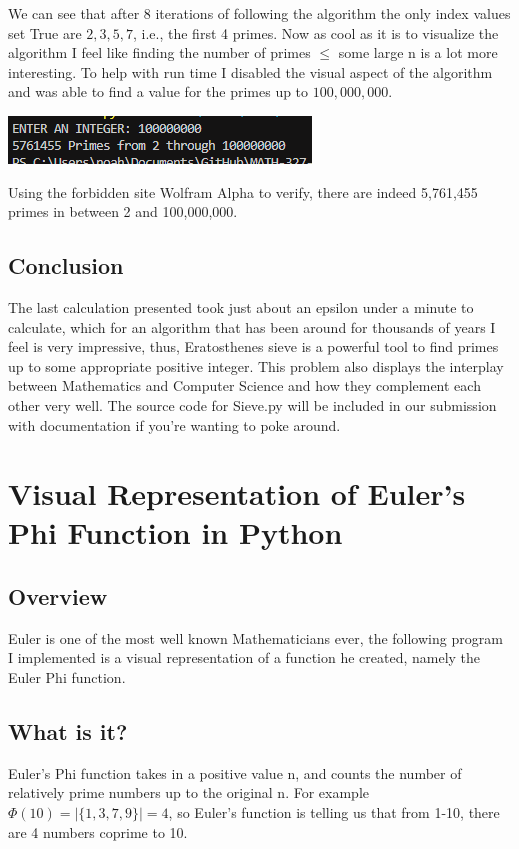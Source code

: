 \documentclass{article}
\begin{document}
We can see that after 8 iterations of following the algorithm the only index values set True are $2,3,5,7$, i.e., the first 4 primes. 
Now as cool as it is to visualize the algorithm I feel like finding the number of primes $\leq$ some large n is a lot more interesting.
To help with run time I disabled the visual aspect of the algorithm and was able to find a value for the primes up to $100,000,000$.
\begin{center}
  \includegraphics[scale=1.0]{primesFound.png}
\end{center}
Using the forbidden site Wolfram Alpha to verify, there are indeed 5,761,455 primes in between 2 and 100,000,000.
\subsection{Conclusion}
The last calculation presented took just about an epsilon under a minute to calculate, which for an algorithm that has been around for thousands of years
I feel is very impressive, thus, Eratosthenes sieve is a powerful tool to find primes up to some appropriate positive integer. This problem also displays the interplay between Mathematics 
and Computer Science and how they complement each other very well. The source code for Sieve.py will be included in our submission with documentation if you're
wanting to poke around.

\newpage
\section{Visual Representation of Euler's Phi Function in Python}
\subsection{Overview}
Euler is one of the most well known Mathematicians ever, the following program I implemented 
is a visual representation of a function he created, namely the Euler Phi function.
\subsection{What is it?}
Euler's Phi function takes in a positive value n, and counts the number of relatively prime numbers up to the original n.
For example $\Phi(10)= |\{1,3,7,9\}| = 4$, so Euler's function is telling us that from 1-10, there are 4 numbers coprime to 10.
\end{document}
